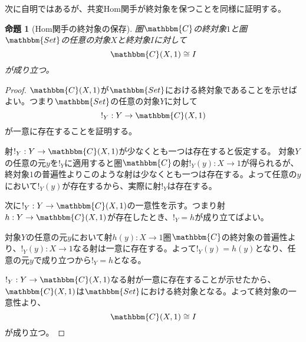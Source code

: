 \documentclass[dvipdfmx]{jsarticle}
\newcommand{\cat}[1]{\mathbbm{#1}}
\newcommand{\arrow}{\rightarrow}
\newcommand{\mor}[3]{#1:#2\arrow #3}
\newcommand{\arset}[3]{\cat{#1}(#2,#3)}
\newtheorem{proof}{証明}[section]
\newtheorem{prop}{命題}[section]
\numberwithin{proof}{subsection}
\numberwithin{prop}{subsection}
\numberwithin{define}{subsection}
\begin{document}
	次に自明ではあるが、共変Hom関手が終対象を保つことを同様に証明する。
	\begin{prop}[Hom関手の終対象の保存]
		圏$\cat{C}$の終対象$1$と圏$\cat{Set}$の任意の対象$X$と終対象$I$に対して\[\arset{C}{X}{1}\cong I\]が成り立つ。
	\end{prop}
	\begin{proof}
		$\arset{C}{X}{1}$が$\cat{Set}$における終対象であることを示せばよい。つまり$\cat{Set}$の任意の対象$Y$に対して\[\mor{!_Y}{Y}{\arset{C}{X}{1}}\]が一意に存在することを証明する。

		射$\mor{!_Y}{Y}{\arset{C}{X}{1}}$が少なくとも一つは存在すると仮定する。
		対象$Y$の任意の元$y$を$!_Y$に適用すると圏$\cat{C}$の射$\mor{!_Y(y)}{X}{1}$が得られるが、終対象$1$の普遍性よりこのような射は少なくとも一つは存在する。よって任意の$y$において$!_Y(y)$が存在するから、実際に射$!_Y$は存在する。
		\begin{center}
		\end{center}
		次に$\mor{!_Y}{Y}{\arset{C}{X}{1}}$の一意性を示す。つまり射$\mor{h}{Y}{\arset{C}{X}{1}}$が存在したとき、$!_Y=h$が成り立てばよい。

		対象$Y$の任意の元$y$において射$\mor{h(y)}{X}{1}$圏$\cat{C}$の終対象の普遍性より、$\mor{!_Y(y)}{X}{1}$なる射は一意に存在する。よって$!_Y(y)=h(y)$となり、任意の元$y$で成り立つから$!_Y=h$となる。


		\begin{center}
		\end{center}
		$\mor{!_Y}{Y}{\arset{C}{X}{1}}$なる射が一意に存在することが示せたから、$\arset{C}{X}{1}$は$\cat{Set}$における終対象となる。よって終対象の一意性より、\[\arset{C}{X}{1}\cong I\]が成り立つ。
	\end{proof}
\end{document}
